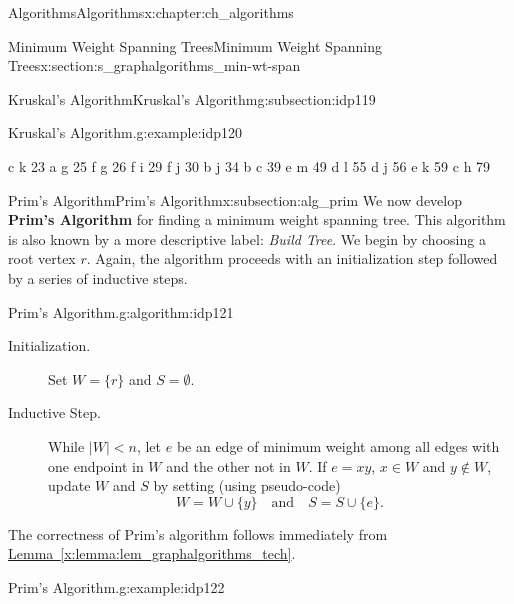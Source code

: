 \documentclass[oneside,10pt,]{book}
\newcommand{\xreffont}{\relax}
\newcommand{\terminology}[1]{\textbf{#1}}
\numberwithin{equation}{section}
\newcommand{\lt}{<}
\begin{document}
\begin{chapterptx}{Algorithms}{}{Algorithms}{}{}{x:chapter:ch_algorithms}
\begin{sectionptx}{Minimum Weight Spanning Trees}{}{Minimum Weight Spanning Trees}{}{}{x:section:s_graphalgorithms_min-wt-span}
\begin{subsectionptx}{Kruskal's Algorithm}{}{Kruskal's Algorithm}{}{}{g:subsection:idp119}
\begin{example}{Kruskal's Algorithm.}{g:example:idp120}
\begin{sidebyside}{2}{0.0125}{0.0125}{0.025}
\begin{sbspanel}{0.78}
\end{sbspanel}%
\begin{sbspanel}{0.17}%
\begin{preformatted}
c k 23
a g 25
f g 26
f i 29
f j 30
b j 34
b c 39
e m 49
d l 55
d j 56
e k 59
c h 79
\end{preformatted}
\end{sbspanel}%
\end{sidebyside}%
\end{example}
\end{subsectionptx}
%
%
\typeout{************************************************}
\typeout{************************************************}
%
\begin{subsectionptx}{Prim's Algorithm}{}{Prim's Algorithm}{}{}{x:subsection:alg_prim}
We now develop \terminology{Prim's Algorithm} for finding a minimum weight spanning tree. This algorithm is also known by a more descriptive label: \emph{Build Tree}. We begin by choosing a root vertex \(r\). Again, the algorithm proceeds with an initialization step followed by a series of inductive steps.%
\begin{algorithm}{Prim's Algorithm.}{}{g:algorithm:idp121}%
%
%
%
\begin{description}
\item[{Initialization.}]Set \(W=\{r\}\) and \(S=\emptyset\).%
\item[{Inductive Step.}]While \(|W| \lt n\), let \(e\) be an edge of minimum weight among all edges with one endpoint in \(W\) and the other not in \(W\).  If \(e=xy\), \(x\in W\) and \(y\not\in W\), update \(W\) and \(S\) by setting (using pseudo-code)%
\begin{equation*}
W = W\cup\{y\}\quad\text{and} \quad S = S\cup\{e\}.
\end{equation*}
%
\end{description}
%
\end{algorithm}
The correctness of Prim's algorithm follows immediately from \hyperref[x:lemma:lem_graphalgorithms_tech]{Lemma~{\xreffont\ref{x:lemma:lem_graphalgorithms_tech}}}.%
\begin{example}{Prim's Algorithm.}{g:example:idp122}%
\begin{sidebyside}{2}{0.0125}{0.0125}{0.025}%
\begin{sbspanel}{0.78}%

\end{sbspanel}
\end{sidebyside}
\end{example}
\end{subsectionptx}
\end{sectionptx}
\end{chapterptx}
\end{document}
